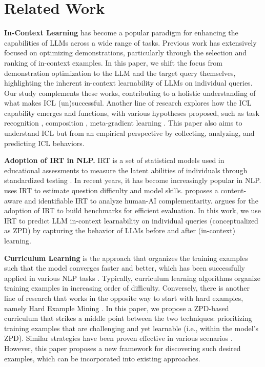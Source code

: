 \section{Related Work}
\noindent \textbf{In-Context Learning} \cite{brown2020language} has become a popular paradigm for enhancing the capabilities of LLMs across a wide range of tasks. 
Previous work has extensively focused on optimizing demonstrations, particularly through the selection \cite{liu-etal-2022-makes,rubin-etal-2022-learning,li2023unified} and ranking \cite{pmlr-v139-zhao21c,lu-etal-2022-fantastically} of in-context examples. 
In this paper, we shift the focus from demonstration optimization to the LLM and the target query themselves, highlighting the inherent in-context learnability of LLMs on individual queries. 
Our study complements these works, contributing to a holistic understanding of what makes ICL (un)successful.
Another line of research explores how the ICL capability emerges and functions, with various hypotheses proposed, such as task recognition \cite{xie2022incontext, 10.5555/3666122.3666809}, composition \cite{li-etal-2024-language}, meta-gradient learning \cite{garg2022can,akyurek2023what}. 
This paper also aims to understand ICL but from an empirical perspective by collecting, analyzing, and predicting ICL behaviors.

\vspace{1.5mm}
\noindent \textbf{Adoption of IRT in NLP.}
IRT is a set of statistical models used in educational assessments to measure the latent abilities of individuals through standardized testing \cite{lord2008statistical, santor1998progress}. 
In recent years, it has become increasingly popular in NLP. 
\citet{byrd2022predicting} uses IRT to estimate question difficulty and model
skills. 
\citet{gor2024great} proposes a content-aware and identifiable IRT to analyze human-AI complementarity. 
\citet{polo2024tinybenchmarks} argues for the adoption of IRT to build benchmarks for efficient evaluation.
In this work, we use IRT to predict LLM in-context learnability on individual queries (conceptualized as ZPD) by capturing the behavior of LLMs before and after (in-context) learning.

\vspace{1.5mm}
\noindent \textbf{Curriculum Learning} \cite{bengio2009curriculum} is the approach that organizes the training examples such that the model converges faster and better, which has been successfully applied in various NLP tasks \cite{tay2019simple,platanios2019competence,sachan2016easy}. 
Typically, curriculum learning algorithms organize training examples in increasing order of difficulty. 
Conversely, there is another line of research that works in the opposite way to start with hard examples, namely Hard Example Mining \cite{shrivastava2016training,jin2018unsupervised}. 
In this paper, we propose a ZPD-based curriculum that strikes a middle point between the two techniques: prioritizing training examples that are challenging and yet learnable (i.e., within the model's ZPD).
Similar strategies have been proven effective in various scenarios \cite{mindermann2022prioritized}. 
However, this paper proposes a new framework for discovering such desired examples, which can be incorporated into existing approaches.
